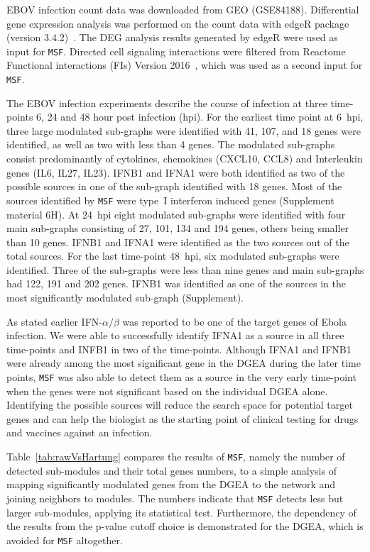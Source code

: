 \documentclass[10pt,a4paper,twocolumn]{article}
\begin{document}
EBOV infection count data was downloaded from GEO (GSE84188). Differential
gene expression analysis was performed on the count data with edgeR package
(version 3.4.2)~\cite{edgeR}. The DEG analysis results generated by edgeR
were used as input for \texttt{MSF}. Directed cell signaling interactions
were filtered from Reactome Functional interactions (FIs) Version
2016~\cite{Cytokegg}, which was used as a second input for \texttt{MSF}.

The EBOV infection experiments describe the course of infection at three
time-points 6, 24 and 48 hour post infection (hpi). For the earliest time
point at 6~hpi, three large modulated sub-graphs were identified with 41,
107, and 18 genes were identified, as well as two with less than 4 genes.
The modulated sub-graphs consist predominantly of cytokines, chemokines
(CXCL10, CCL8) and Interleukin genes (IL6, IL27, IL23).
IFNB1 and IFNA1 were both identified as two of the possible sources
in one of the sub-graph identified with 18 genes.
Most of the sources identified by \texttt{MSF} were
type~I interferon induced genes (Supplement material 6H).
At 24~hpi eight modulated sub-graphs were
identified with four main sub-graphs consisting
of 27, 101, 134 and 194 genes, others being smaller than 10 genes. IFNB1
and IFNA1 were identified as the two sources out of the total sources. For the last time-point 48~hpi,
six modulated sub-graphs were identified. Three of the sub-graphs were
less than nine genes and main sub-graphs had 122, 191 and 202 genes. IFNB1 was identified as one of the sources in
the most significantly modulated sub-graph (Supplement).

As stated earlier IFN-$\alpha / \beta$ was reported to be one of the target
genes of Ebola infection. We were able to successfully identify IFNA1 as a
source in all three time-points and INFB1 in two of the
time-points. Although IFNA1 and IFNB1 were already among the most
significant gene in the DGEA during the later time points, \texttt{MSF} was
also able to detect them as a source in the very early time-point when the
genes were not significant based on the individual DGEA alone. Identifying
the possible sources will reduce the search space for potential target
genes and can help the biologist as the starting point of clinical testing
for drugs and vaccines against an infection.

Table~\ref{tab:rawVsHartung} compares the results of \texttt{MSF}, namely
the number of detected sub-modules and their total genes numbers, to a
simple analysis of mapping significantly modulated genes from the DGEA to
the network and joining neighbors to modules. The numbers indicate that
\texttt{MSF} detects less but larger sub-modules, applying its statistical
test.  Furthermore, the dependency of the results from the p-value cutoff
choice is demonstrated for the DGEA, which is avoided for \texttt{MSF}
altogether.
\end{document}
